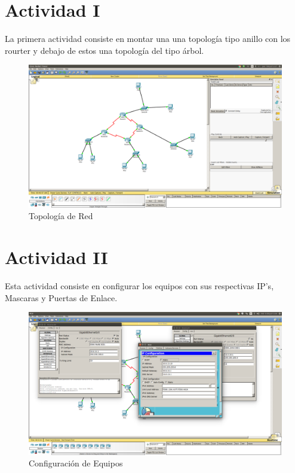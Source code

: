\documentclass[spanish]{udpreport}
\begin{document}
\section{Actividad I}

La primera actividad consiste en montar una una topología tipo anillo con los rourter y debajo de estos una topología del tipo árbol.

\begin{figure}[H]
	\centering
	\includegraphics[scale=.25]{imagenes/red.png}
	\caption{Topología de Red}
	\label{fig:Figura 2.1}
\end{figure}

\section{Actividad II}

Esta actividad consiste en configurar los equipos con sus respectivas IP's, Mascaras y Puertas de Enlace.

\begin{figure}[H]
	\centering
	\includegraphics[scale=.25]{imagenes/ips.png}
	\caption{Configuración de Equipos}
	\label{fig:Figura 3.1}
\end{figure}
\end{document}
